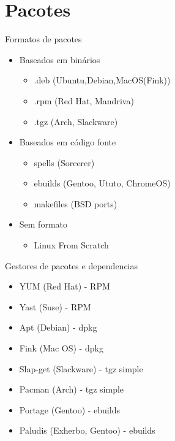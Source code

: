 \documentclass{beamer}
\begin{document}
\section{Pacotes}
\begin{frame}{Formatos de pacotes}
\begin{itemize}
\item Baseados em binários
\begin{itemize}
\item .deb (Ubuntu,Debian,MacOS(Fink))
\item .rpm (Red Hat, Mandriva)
\item .tgz (Arch, Slackware)
\end{itemize}
\item Baseados em código fonte
\begin{itemize}
\item spells (Sorcerer)
\item ebuilds (Gentoo, Ututo, ChromeOS)
\item makefiles (BSD ports)
\end{itemize}
\item Sem formato
\begin{itemize}
\item Linux From Scratch
\end{itemize}
\end{itemize}
\end{frame}

\begin{frame}{Gestores de pacotes e dependencias}
\begin{itemize}
\item YUM (Red Hat) - RPM
\item Yast (Suse) - RPM
\item Apt (Debian) - dpkg
\item Fink (Mac OS) - dpkg
\item Slap-get (Slackware) - tgz simple
\item Pacman (Arch) - tgz simple
\item Portage (Gentoo) - ebuilds
\item Paludis (Exherbo, Gentoo) - ebuilds
\end{itemize}
\end{frame}
\end{document}
